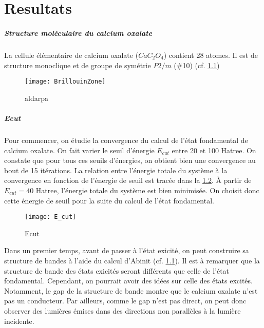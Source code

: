 \chapter{Resultats}


\label{Chap-Res}

\paragraph{Structure moléculaire du calcium oxalate}
La cellule élémentaire de calcium oxalate ($Ca C_2 O_4$) contient 28 atomes. Il est de structure monoclique et de groupe de symétrie $P2/m$ ($\#$10) (cf. \cref{BrillouinZone})

\begin{figure}[!h]\label{BrillouinZone}
    \centering
    \texttt{[image: BrillouinZone]}
    \caption{aldarpa}
\end{figure}
\paragraph{Ecut}
Pour commencer, on étudie la convergence du calcul de l'état fondamental de calcium oxalate. On fait varier le seuil d'énergie $E_{cut}$ entre 20 et 100 Hatree.
On constate que pour tous ces seuils d'énergies, on obtient bien une convergence au bout de 15 itérations. La relation entre l'énergie totale du système à la convergence en fonction de l'énergie de seuil est tracée dans la \cref{Ecut}.
À partir de $E_{cut} = 40$ Hatree, l'énergie totale du système est bien minimisée. On choisit donc cette énergie de seuil pour la suite du calcul de l'état fondamental.

\begin{figure}[!h]\label{Ecut}
    \centering
    \texttt{[image: E\_cut]}
    \caption{Ecut}
\end{figure}


Dans un premier temps, avant de passer à l'état exicité, on peut construire sa structure de bandes à l'aide du calcul d'Abinit (cf. \cref{BrillouinZone}).
Il est à remarquer que la structure de bande des états exicités seront différents que celle de l'état fondamental.
Cependant, on pourrait avoir des idées sur celle des états excités.
Notamment, le gap de la structure de bande montre que le calcium oxalate n'est pas un conducteur.
Par ailleurs, comme le gap n'est pas direct, on peut donc observer des lumières émises dans des directions non parallèles à la lumière incidente.

